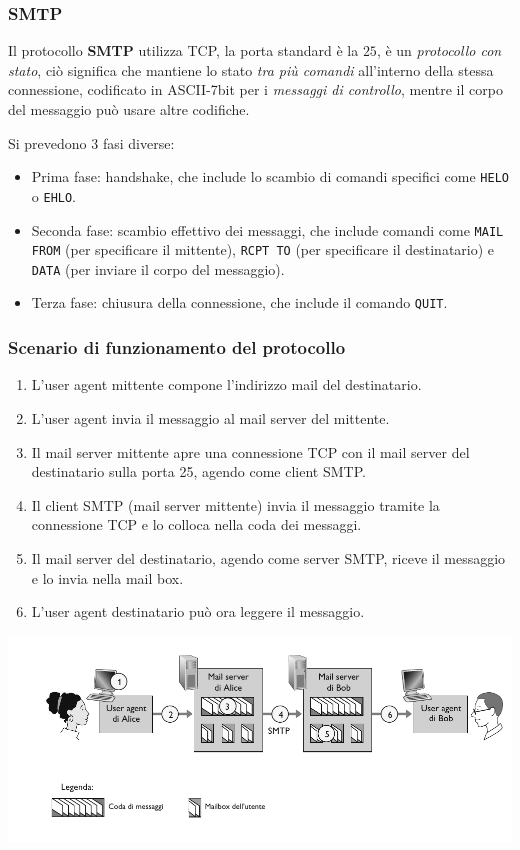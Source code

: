 \subsubsection{SMTP}
Il protocollo \textbf{SMTP} utilizza TCP, la porta standard è la $25$, è un \textit{protocollo con stato}, ciò significa che mantiene lo stato \textit{tra più comandi} all'interno della stessa connessione, codificato in ASCII-7bit per i \textit{messaggi di controllo}, mentre il corpo del messaggio può usare altre codifiche.

Si prevedono 3 fasi diverse:
\begin{itemize}
  \item Prima fase: handshake, che include lo scambio di comandi specifici come \texttt{HELO} o \texttt{EHLO}.
  \item Seconda fase: scambio effettivo dei messaggi, che include comandi come \texttt{MAIL FROM} (per specificare il mittente), \texttt{RCPT TO} (per specificare il destinatario) e \texttt{DATA} (per inviare il corpo del messaggio).
  \item Terza fase: chiusura della connessione, che include il comando \texttt{QUIT}.
\end{itemize}

\subsubsection*{Scenario di funzionamento del protocollo}
\begin{enumerate}
  \item L'user agent mittente compone l'indirizzo mail del destinatario.
  \item L'user agent invia il messaggio al mail server del mittente.
  \item Il mail server mittente apre una connessione TCP con il mail server del destinatario sulla porta 25, agendo come client SMTP.
  \item Il client SMTP (mail server mittente) invia il messaggio tramite la connessione TCP e lo colloca nella coda dei messaggi.
  \item Il mail server del destinatario, agendo come server SMTP, riceve il messaggio e lo invia nella mail box.
  \item L'user agent destinatario può ora leggere il messaggio.
\end{enumerate}

\includegraphics[width=\textwidth]{./img/smtp.png}

